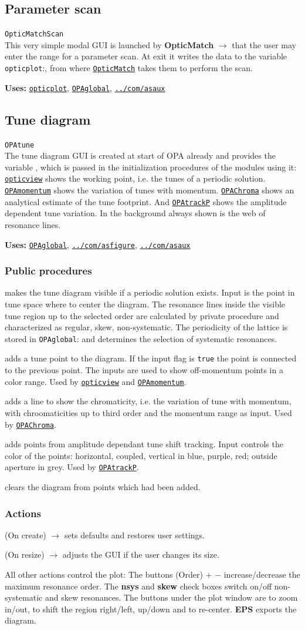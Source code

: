 \documentclass[12pt]{article}
\newcommand\code[1]{{\tt #1}}
\newcommand{\ofld}[1]{\colorbox{black!15}{{\bf #1}}}
\newcommand{\ofldx}[1]{\colorbox{black!15}{(#1)}}
\newcommand\guico[1]{{\color{blue}\code{#1}}}
\newcommand{\unico}[1]{{\color{burntorange}\code{#1}}}
\newcommand{\evcod}[2]{\ofld{#1} $\rightarrow$ \guico{#2}}
\newcommand{\evcodx}[2]{\ofldx{#1} $\rightarrow$ \guico{#2}}
\newcommand{\vrcod}[2]{\opauni{#1}:\unico{#2}}
\newcommand{\opagui}[1]{\colorbox{blue!20}{\code{#1}}}
\newcommand{\oguih}[2]{\subsection{\label{#2}#1}{\Huge\opagui{#2}}\\}
\newcommand{\ogui}[1]{\hyperref[#1]{\opagui{#1}}}
\newcommand{\opaguif}[1]{\colorbox{violet!30}{\code{#1}}}
\newcommand{\oguif}[1]{\hyperref[#1]{\opaguif{#1}}}
\newcommand{\opauni}[1]{\colorbox{orange!30}{\code{#1}}}
\newcommand{\ouni}[1]{\hyperref[#1]{\opauni{#1}}}
\newcommand{\uses}[1]{{\bf Uses: } #1}
\newcommand{\desc}[1]{#1}
\newcommand{\act}[1]{\subsubsection*{Actions} #1}
\newcommand{\ppro}[1]{\subsubsection*{Public procedures} #1}
\begin{document}
\oguih{Parameter scan}{OpticMatchScan}

\desc{This very simple modal GUI is launched by \evcod{OpticMatch}{ScanClick} that the user may enter the range for a parameter scan. At exit it writes the data to the variable \vrcod{opticplot}{ScanPar}, from where \ogui{OpticMatch} takes them to perform the scan.}

\uses{\ouni{opticplot}, \ouni{OPAglobal}, \ouni{../com/asaux}} 


\oguih{Tune diagram}{OPAtune}

\desc{The tune diagram GUI is created at start of OPA already and provides the variable \guico{tuneplot}, which is passed in the initialization procedures of the modules using it: \ogui{opticview} shows the working point, i.e. the tunes of a periodic solution. \ogui{OPAmomentum} shows the variation of tunes with momentum. \ogui{OPAChroma} shows an analytical estimate of the tune footprint. And \ogui{OPAtrackP} shows the amplitude dependent tune variation. In the background always shown is the web of resonance lines.}

\uses{\ouni{OPAglobal}, \oguif{../com/asfigure}, \ouni{../com/asaux}}

\ppro{
\guico{Diagram} makes the tune diagram visible if a periodic solution exists. Input is the point in tune space where to center the diagram.  The resonance lines inside the visible tune region up to the selected order are calculated by private procedure \unico{getLines} and characterized as regular, skew, non-systematic.  The periodicity of the lattice is stored in \vrcod{OPAglobal}{NPer} and determines the selection of systematic resonances. 

\guico{AddTunePoint} adds a tune point to the diagram. If the input flag \guico{connect} is \code{true} the point is connected to the previous point. The inputs \guico{dpp, dppmax} are used to show off-momentum points in a color range. Used by \ogui{opticview} and \ogui{OPAmomentum}.

\guico{AddChromLine} adds a line to show the chromaticity, i.e. the variation of tune with momentum, with chroomaticities up to third order and the momentum range as input. Used by \ogui{OPAChroma}.

\guico{AddTushPoint} adds points from amplitude dependant tune shift tracking. Input \guico{xmy} controls the color of the points: horizontal, coupled, vertical in blue, purple, red; outside aperture in grey. Used by \ogui{OPAtrackP}.

\guico{Refresh} clears the diagram from points which had been added.
}
\act{
\evcodx{On create}{FormCreate} sets defaults and restores user settings.

\evcodx{On resize}{FormResize} adjusts the GUI if the user changes its size.

All other actions control the plot: The buttons \ofldx{Order} \ofld{$+$} \ofld{$-$} increase/decrease the maximum resonance order. The \ofld{nsys} and \ofld{skew} check boxes switch on/off non-systematic and skew resonances. The buttons under the plot window are to zoom in/out, to shift the region right/left, up/down and to re-center. \ofld{EPS} exports the diagram.
}
\end{document}
